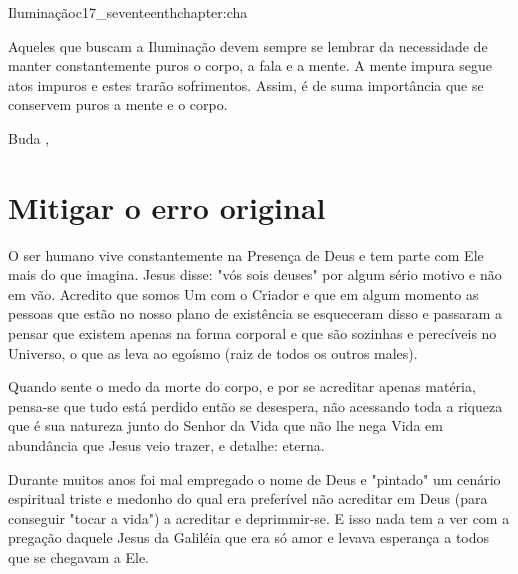 \begin{chapterpage}{Iluminação}{c17_seventeenthchapter:cha}

\begin{myquotation}Aqueles que buscam a Iluminação devem sempre se lembrar da necessidade de manter constantemente puros o corpo, a fala e a mente. A mente impura segue atos impuros e estes trarão sofrimentos. Assim, é de suma importância que se conservem puros a mente e o corpo.
 
\par\vspace*{15mm}
\mbox{}\hfill \emdash{}Buda 
, %
\par\end{myquotation}

\end{chapterpage}



\section{Mitigar o erro original}\label{c1_basicformatting:sec}

\emdash{}O ser humano vive constantemente na Presença de Deus e tem parte com Ele mais do que imagina. Jesus disse: "vós sois deuses" por algum sério motivo e não em vão. Acredito que somos Um com o Criador e que em algum momento as pessoas que estão no nosso plano de existência se esqueceram disso e passaram a pensar que existem apenas na forma corporal e que são sozinhas e perecíveis no Universo, o que as leva ao egoísmo (raiz de todos os outros males).

\emdash{}Quando sente o medo da morte do corpo, e por se acreditar apenas matéria, pensa-se que tudo está perdido então se desespera, não acessando toda a riqueza que é sua natureza junto do Senhor da Vida que não lhe nega Vida em abundância que Jesus veio trazer, e detalhe: eterna.

\emdash{}Durante muitos anos foi mal empregado o nome de Deus e "pintado" um cenário espiritual triste e medonho do qual era preferível não acreditar em Deus (para conseguir "tocar a vida") a acreditar e deprimmir-se. E isso nada tem a ver com a pregação daquele Jesus da Galiléia que era só amor e levava esperança a todos que se chegavam a Ele.

